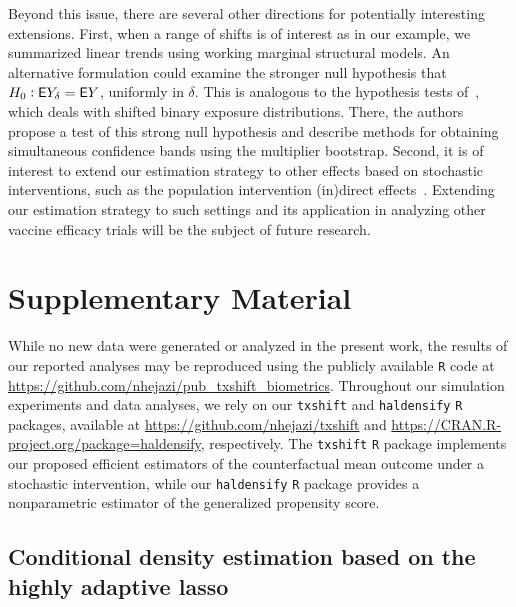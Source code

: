 Beyond this issue, there are several other directions for potentially
interesting extensions. First, when a range of shifts is of interest as in our
example, we summarized linear trends using working marginal structural models.
An alternative formulation could examine the stronger null hypothesis that $H_0:
\mathsf{E} Y_{\delta} = \mathsf{E} Y$, uniformly in $\delta$. This is analogous to the
hypothesis tests of~\citet{kennedy2019nonparametric}, which deals with shifted
binary exposure distributions. There, the authors propose a test of this strong
null hypothesis and describe methods for obtaining simultaneous confidence bands
using the multiplier bootstrap. Second, it is of interest to extend our
estimation strategy to other effects based on stochastic interventions, such as
the population intervention (in)direct effects~\citep{diaz2020causal}. Extending
our estimation strategy to such settings and its application in analyzing other
vaccine efficacy trials will be the subject of future research.

\section{Supplementary Material}\label{sm}

While no new data were generated or analyzed in the present work, the results of
our reported analyses may be reproduced using the publicly available \texttt{R}
code at \url{https://github.com/nhejazi/pub_txshift_biometrics}. Throughout our
simulation experiments and data analyses, we rely on our \texttt{txshift} and
\texttt{haldensify} \texttt{R} packages, available at
\url{https://github.com/nhejazi/txshift} and
\url{https://CRAN.R-project.org/package=haldensify}, respectively. The
\texttt{txshift} \texttt{R} package implements our proposed efficient estimators
of the counterfactual mean outcome under a stochastic intervention, while our
\texttt{haldensify} \texttt{R} package provides a nonparametric estimator of the
generalized propensity score.

\subsection{Conditional density estimation based on the highly adaptive
lasso}\label{cond_dens}

